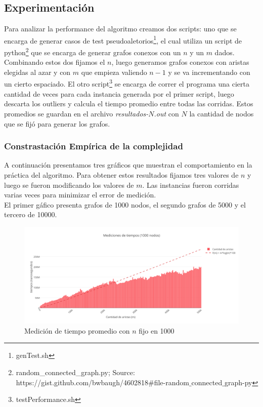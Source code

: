 \newpage

\subsection{Experimentación}

Para analizar la performance del algoritmo creamos dos scripts: uno que se encarga de generar casos de test pseudoaletorios\footnote{genTest.sh}, el cual utiliza un script de python\footnote{random_connected_graph.py; Source: https://gist.github.com/bwbaugh/4602818$\#$file-random$\_$connected$\_$graph-py} que se encarga de generar grafos conexos con un $n$ y un $m$ dados. Combinando estos dos fijamos el $n$, luego generamos grafos conexos con aristas elegidas al azar y con $m$ que empieza valiendo $n-1$ y se va incrementando con un cierto espaciado. El otro script\footnote{testPerformance.sh} se encarga de correr el programa una cierta cantidad de veces para cada instancia generada por el primer script, luego descarta los outliers y calcula el tiempo promedio entre todas las corridas. Estos promedios se guardan en el archivo \emph{resultados-$N$.out} con $N$ la cantidad de nodos que se fijó para generar los grafos.


\subsubsection{Constrastación Empírica de la complejidad}

A continuación presentamos tres gráficos que muestran el comportamiento en la práctica del algoritmo. Para obtener estos resultados fijamos tres valores de $n$ y luego se fueron modificando los valores de $m$. Las instancias fueron corridas varias veces para minimizar el error de medición.\\

El primer gáfico presenta grafos de 1000 nodos, el segundo grafos de 5000 y el tercero de 10000.

\begin{figure}[H]
	\centering
 	\includegraphics[scale=0.6]{imagenes/ej3/tiempos1000B.png}
	\caption{Medición de tiempo promedio con $n$ fijo en 1000}
 \end{figure}

